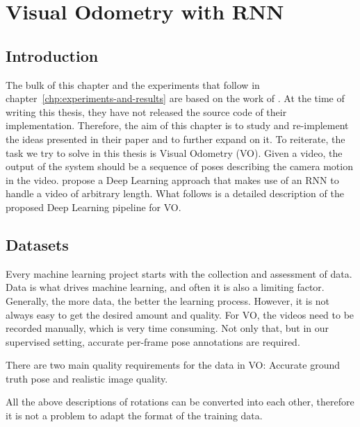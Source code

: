 \chapter{Visual Odometry with RNN}\label{chp:the_model}
	\def\CC{{C\nolinebreak[4]\hspace{-.05em}\raisebox{.4ex}{\tiny\bf ++}}}

	\section{Introduction}
		The bulk of this chapter and the experiments that follow in chapter~\ref{chp:experiments-and-results} are based on the work of \cite{wang2017deepvo}.
		At the time of writing this thesis, they have not released the source code of their implementation.
		Therefore, the aim of this chapter is to study and re-implement the ideas presented in their paper and to further expand on it.
		To reiterate, the task we try to solve in this thesis is Visual Odometry (VO).
		Given a video, the output of the system should be a sequence of poses describing the camera motion in the video.
		\citeauthor{wang2017deepvo} propose a Deep Learning approach that makes use of an RNN to handle a video of arbitrary length.
		What follows is a detailed description of the proposed Deep Learning pipeline for VO.
	
	\section{Datasets}
		Every machine learning project starts with the collection and assessment of data.
		Data is what drives machine learning, and often it is also a limiting factor.
		Generally, the more data, the better the learning process.
		However, it is not always easy to get the desired amount and quality.
		For VO, the videos need to be recorded manually, which is very time consuming.
		Not only that, but in our supervised setting, accurate per-frame pose annotations are required.
		
		There are two main quality requirements for the data in VO: Accurate ground truth pose and realistic image quality.
		
		
		
		All the above descriptions  of rotations can be converted into each other, therefore it is not a problem to adapt the format of the training data.

